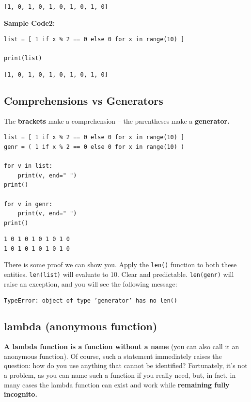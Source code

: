 \documentclass[11pt]{article}
\begin{document}
\begin{verbatim}
[1, 0, 1, 0, 1, 0, 1, 0, 1, 0]
\end{verbatim}

\vspace{10 mm}

\textbf{Sample Code2:}
\begin{verbatim}
list = [ 1 if x % 2 == 0 else 0 for x in range(10) ]

print(list)
\end{verbatim}

\begin{verbatim}
[1, 0, 1, 0, 1, 0, 1, 0, 1, 0]
\end{verbatim}

\newpage

\subsection{Comprehensions vs Generators}
\label{sec:org0f4e276}
The \textbf{brackets} make a comprehension – the parentheses make a \textbf{generator.}

\begin{verbatim}
list = [ 1 if x % 2 == 0 else 0 for x in range(10) ]
genr = ( 1 if x % 2 == 0 else 0 for x in range(10) )

for v in list:
	print(v, end=" ")
print()

for v in genr:
	print(v, end=" ")
print()
\end{verbatim}

\begin{verbatim}
1 0 1 0 1 0 1 0 1 0 
1 0 1 0 1 0 1 0 1 0 
\end{verbatim}

There is some proof we can show you. Apply the \texttt{len()} function to both
these entities. \texttt{len(list)} will evaluate to 10. Clear and predictable.
\texttt{len(genr)} will raise an exception, and you will see the following
message:

\texttt{TypeError: object of type 'generator' has no len()}

\subsection{lambda (anonymous function)}
\label{sec:orgdb27365}
\textbf{A lambda function is a function without a name} (you can also call it
an anonymous function). Of course, such a statement immediately raises
the question: how do you use anything that cannot be identified?
Fortunately, it’s not a problem, as you can name such a function if
you really need, but, in fact, in many cases the lambda function can
exist and work while \textbf{remaining fully incognito.}
\end{document}
